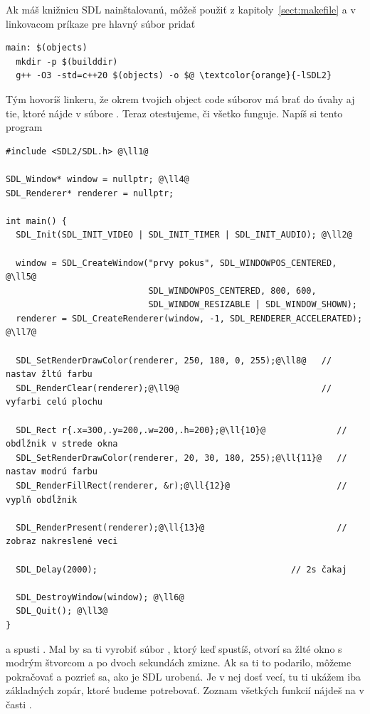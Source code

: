Ak máš knižnicu SDL nainštalovanú, môžeš použiť   z kapitoly~\ref{sect:makefile} a v linkovacom príkaze pre hlavný súbor pridať

\begin{Verbatim}[frame=single]
main: $(objects)
  mkdir -p $(builddir)
  g++ -O3 -std=c++20 $(objects) -o $@ \textcolor{orange}{-lSDL2}
\end{Verbatim}

Tým hovoríš linkeru, že okrem tvojich object code súborov  má brať do úvahy aj tie, ktoré nájde v súbore . Teraz otestujeme, či všetko funguje.
Napíš si tento program \\

\begin{lstlisting}[label={l:sdl.1}]
#include <SDL2/SDL.h> @\ll1@

SDL_Window* window = nullptr; @\ll4@
SDL_Renderer* renderer = nullptr;

int main() {
  SDL_Init(SDL_INIT_VIDEO | SDL_INIT_TIMER | SDL_INIT_AUDIO); @\ll2@

  window = SDL_CreateWindow("prvy pokus", SDL_WINDOWPOS_CENTERED, @\ll5@
                            SDL_WINDOWPOS_CENTERED, 800, 600,
                            SDL_WINDOW_RESIZABLE | SDL_WINDOW_SHOWN);
  renderer = SDL_CreateRenderer(window, -1, SDL_RENDERER_ACCELERATED); @\ll7@

  SDL_SetRenderDrawColor(renderer, 250, 180, 0, 255);@\ll8@   // nastav žltú farbu 
  SDL_RenderClear(renderer);@\ll9@                            // vyfarbi celú plochu 

  SDL_Rect r{.x=300,.y=200,.w=200,.h=200};@\ll{10}@              // obdĺžnik v strede okna  
  SDL_SetRenderDrawColor(renderer, 20, 30, 180, 255);@\ll{11}@   // nastav modrú farbu 
  SDL_RenderFillRect(renderer, &r);@\ll{12}@                     // vyplň obdĺžnik

  SDL_RenderPresent(renderer);@\ll{13}@                          // zobraz nakreslené veci

  SDL_Delay(2000);                                      // 2s čakaj

  SDL_DestroyWindow(window); @\ll6@
  SDL_Quit(); @\ll3@
}
\end{lstlisting}

a spusti . Mal by sa ti vyrobiť súbor , ktorý keď spustíš, otvorí sa žlté okno s modrým štvorcom 
a po dvoch sekundách zmizne. Ak sa ti to podarilo, môžeme pokračovať
a pozrieť sa, ako je SDL urobená. Je v nej dosť vecí, tu ti ukážem iba základných zopár, ktoré budeme potrebovať. Zoznam všetkých funkcií nájdeš
na  v časti .

